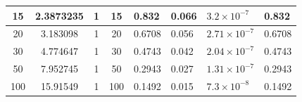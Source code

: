 \documentclass{article}
\begin{document}
\begin{table}[H]
\begin{tabular}{|c|c|c|c|l|l|l|l|}
15                                                            & 2.3873235                                                & 1                                                       & 15                                                            & 0.832                                                                        & 0.066                                                                          & $ 3.2\times10^{-7}$                                                      & 0.832                                                                     \\ \hline
20                                                            & 3.183098                                                 & 1                                                       & 20                                                            & 0.6708                                                                       & 0.056                                                                          & $ 2.71\times10^{-7}$                                                     & 0.6708                                                                    \\ \hline
30                                                            & 4.774647                                                 & 1                                                       & 30                                                            & 0.4743                                                                       & 0.042                                                                          & $ 2.04\times10^{-7}$                                                     & 0.4743                                                                    \\ \hline
50                                                            & 7.952745                                                 & 1                                                       & 50                                                            & 0.2943                                                                       & 0.027                                                                          & $ 1.31\times10^{-7}$                                                     & 0.2943                                                                    \\ \hline
100                                                           & 15.91549                                                 & 1                                                       & 100                                                           & 0.1492                                                                       & 0.015                                                                          & $ 7.3\times10^{-8}$                                                      & 0.1492                                                                    \\ \hline
\end{tabular}
\end{table}
\end{document}
